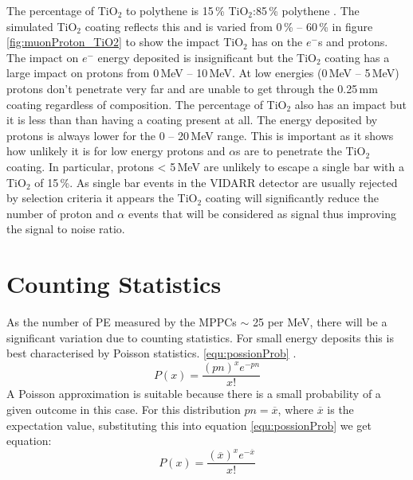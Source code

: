 
The percentage of TiO$_2$ to polythene is 15\,\% TiO$_2$:85\,\% polythene \cite{aliaga2014design} \cite{Pla-Dalmau2014}. The simulated TiO$_2$ coating reflects this and is varied from 0\,\% -- 60\,\% in figure \ref{fig:muonProton_TiO2} to show the impact TiO$_2$ has on the $e^-$s and protons. The impact on $e^-$ energy deposited is insignificant but the TiO$_2$ coating has a large impact on protons from 0\,MeV -- 10\,MeV. At low energies (0\,MeV -- 5\,MeV) protons don't penetrate very far and are unable to get through the 0.25\,mm coating regardless of composition. The percentage of TiO$_2$ also has an impact but it is less than than having a coating present at all. The energy deposited by protons is always lower for the 0 -- 20\,MeV range. This is important as it shows how unlikely it is for low energy protons and $\alpha$s are to penetrate the TiO$_2$ coating. In particular, protons < 5\,MeV are unlikely to escape a single bar with a TiO$_2$ of 15\,\%. As single bar events in the VIDARR detector are usually rejected by selection criteria it appears the TiO$_2$ coating will significantly reduce the number of proton and $\alpha$ events that will be considered as signal thus improving the signal to noise ratio. 

\section{Counting Statistics} \label{sec:GEANT4Simulation_countingStats}
As the number of PE measured by the MPPCs $\sim$ 25 per MeV, there will be a significant variation due to counting statistics. For small energy deposits this is best characterised by Poisson statistics. \ref{equ:possionProb} \cite{knoll_2010}.
\begin{equation}
P(x) = \frac{(pn)^x e^{-pn}}{x!}  
\label{equ:possionProb}
\end{equation}
A Poisson approximation is suitable because there is a small probability of a given outcome in this case. For this distribution $pn = \overline{x}$, where $\overline{x}$ is the expectation value, substituting this into equation \ref{equ:possionProb} we get equation: 
\begin{equation}
P(x) = \frac{(\overline{x})^x e^{-\overline{x}}}{x!}  
\label{equ:possionExpectation}
\end{equation}

